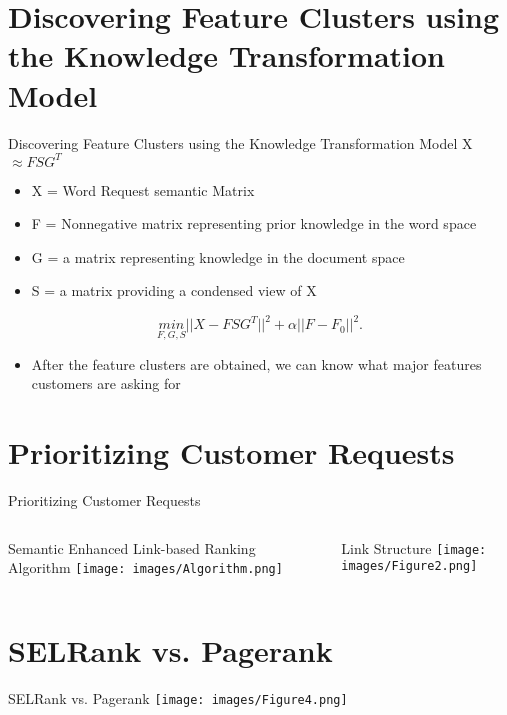 \documentclass{beamer}
\begin{document}
\section{Discovering Feature Clusters using the Knowledge Transformation Model}
\begin{frame}{Discovering Feature Clusters using the Knowledge Transformation Model}
X $\approx FSG^T$

\begin{itemize}
    \item X = Word Request semantic Matrix
    \item F = Nonnegative matrix representing prior knowledge in the word space
    \item G = a matrix representing knowledge in the document space
    \item S = a matrix providing a condensed view of X
\end{itemize}
    
$$\underset{F,G,S}{min} || X- FSG^T||^2+\alpha||F-F_0||^2.$$
    
\begin{itemize}
    \item After the feature clusters are obtained, we can know what major features customers are asking for
\end{itemize}
\end{frame}
\section{Prioritizing Customer Requests}
\begin{frame}{Prioritizing Customer Requests}
\begin{columns}
        Semantic Enhanced Link-based Ranking Algorithm
        \texttt{[image: images/Algorithm.png]}
        
    Link Structure
    \texttt{[image: images/Figure2.png]}
\end{columns}
\end{frame}

\section{SELRank vs. Pagerank}
\begin{frame}{SELRank vs. Pagerank}
\texttt{[image: images/Figure4.png]}
\end{frame}
\end{document}
